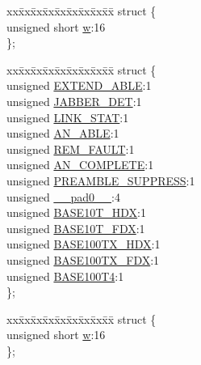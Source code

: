 \begin{DoxyCompactItemize}
\begin{tabbing}
\end{tabbing}\item 
\begin{tabbing}
xx\=xx\=xx\=xx\=xx\=xx\=xx\=xx\=xx\=\kill
struct \{\\
\>unsigned short \hyperlink{union_____b_m_s_t_a_tbits__t_a160850a4684a3e82c2323033964f2e98}{w}:16\\
\}; \\

\end{tabbing}\item 
\begin{tabbing}
xx\=xx\=xx\=xx\=xx\=xx\=xx\=xx\=xx\=\kill
struct \{\\
\>unsigned \hyperlink{union_____b_m_s_t_a_tbits__t_ab10a9d0fb45c718dc8e61daab8f8e451}{EXTEND\_ABLE}:1\\
\>unsigned \hyperlink{union_____b_m_s_t_a_tbits__t_a811ba1221b0907d29b86d727fdb0ba22}{JABBER\_DET}:1\\
\>unsigned \hyperlink{union_____b_m_s_t_a_tbits__t_a173180645a6b646647b053a632c6e578}{LINK\_STAT}:1\\
\>unsigned \hyperlink{union_____b_m_s_t_a_tbits__t_a4415cfc8a972fcbbbd468486c646758b}{AN\_ABLE}:1\\
\>unsigned \hyperlink{union_____b_m_s_t_a_tbits__t_acff720284bf641e0b589ea7feb2d3199}{REM\_FAULT}:1\\
\>unsigned \hyperlink{union_____b_m_s_t_a_tbits__t_a7f52210e51776891e15cedc2d8c54686}{AN\_COMPLETE}:1\\
\>unsigned \hyperlink{union_____b_m_s_t_a_tbits__t_a2a149058307fb7fbeac4de56b4b42d41}{PREAMBLE\_SUPPRESS}:1\\
\>unsigned \hyperlink{union_____b_m_s_t_a_tbits__t_adf71f3d8410c1f1dbbc96680a92c49af}{\_\_pad0\_\_}:4\\
\>unsigned \hyperlink{union_____b_m_s_t_a_tbits__t_ad90cb0b4d51e1c207ef6955ea5f42d3e}{BASE10T\_HDX}:1\\
\>unsigned \hyperlink{union_____b_m_s_t_a_tbits__t_a60f1f5eeed205a15bb647dffff3a2ee3}{BASE10T\_FDX}:1\\
\>unsigned \hyperlink{union_____b_m_s_t_a_tbits__t_acd7af0b5457a59e2264b35898c9b070f}{BASE100TX\_HDX}:1\\
\>unsigned \hyperlink{union_____b_m_s_t_a_tbits__t_a62518f2f0d4bbb7e6f305cf513b7db56}{BASE100TX\_FDX}:1\\
\>unsigned \hyperlink{union_____b_m_s_t_a_tbits__t_ae7aa36d7ff2e31c4eb9726c67e04dfea}{BASE100T4}:1\\
\}; \\

\end{tabbing}\item 
\begin{tabbing}
xx\=xx\=xx\=xx\=xx\=xx\=xx\=xx\=xx\=\kill
struct \{\\
\>unsigned short \hyperlink{union_____b_m_s_t_a_tbits__t_a160850a4684a3e82c2323033964f2e98}{w}:16\\
\}; \\

\end{tabbing}\end{DoxyCompactItemize}


